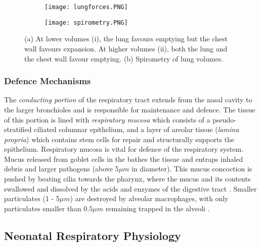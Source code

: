 \documentclass[12pt, openany, oneside]{book}
\begin{document}
\begin{figure}
\centering
	
	
	\begin{subfigure}{.7\textwidth}
		\centering
		\texttt{[image: lungforces.PNG]}		
		\caption{}
		\label{fig:resp}
	\end{subfigure}
	
	\begin{subfigure}{.75\textwidth}
		\centering
		\texttt{[image: spirometry.PNG]}		
		\caption{}
		\label{fig:alveolarsac}
	\end{subfigure}	
	

	\caption[Respiratory Mechanics]{(a) At lower volumes (i), the lung favours emptying but the chest wall favours expansion. At higher volumes (ii), both the lung and the chest wall favour emptying. (b) Spirometry of lung volumes. \citep{respShade}} 
\label{fig:forces}

\end{figure}




\subsubsection{Defence Mechanisms}

The \textit{conducting portion} of the respiratory tract extends from the nasal cavity to the larger bronchioles and is responsible for maintenance and defence. The tissue of this portion is lined with \textit{respiratory mucosa} which consists of a pseudo-stratified ciliated columnar epithelium, and a layer of areolar tissue (\textit{lamina propria}) which contains stem cells for repair and structurally supports the epithelium. Respiratory mucosa is vital for defence of the respiratory system. Mucus released from goblet cells in the bathes the tissue and entraps inhaled debris and larger pathogens (above 5${\mu}m$ in diameter). This mucus concoction is pushed by beating cilia towards the pharynx, where the mucus and its contents swallowed and dissolved by the acids and enzymes of the digestive tract \cite{martini}. Smaller particulates (1 - 5${\mu}m$) are destroyed by alveolar macrophages, with only particulates smaller than $0.5{\mu}m$ remaining trapped in the alveoli \cite{martini,khajeh2015deposition}.  \\


\subsection{Neonatal Respiratory Physiology}
\end{document}
